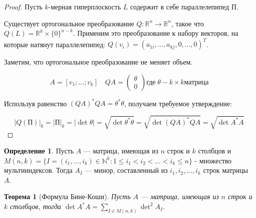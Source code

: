 \documentclass[a5paper]{article}
\newcounter{through}
\theoremstyle{plain}
\newtheorem{theorem}[through]{Теорема}
\theoremstyle{definition}
\newtheorem{definition}[through]{Определение}
\numberwithin{through}{section}
\numberwithin{equation}{section}
\begin{document}
\begin{proof}
	Пусть $k$-мерная гиперплоскость $L$ содержит в себе параллелепипед $\text{П}$.
	
	Существует ортогональное преобразование $Q : \mathbb{R}^n \to \mathbb{R}^n$, такое что $Q(L) = \mathbb{R}^k \times \{0\}^{n-k}$. Применим это преобразование к набору векторов, на которые натянут параллелепипед: $Q(v_i)=(a_{1i}, \ldots, a_{kj}, 0, \ldots, 0)^T$.
	
	Заметим, что ортогональное преобразование не меняет объем.
	
	\begin{equation*}
		A = [v_1; \ldots; v_k] \quad QA = 
		\begin{pmatrix}
			\theta \\
			0
		\end{pmatrix} 
		\text{где} \; \theta -  k \times k \text{матрица}
	\end{equation*}
	
	Используя равенство $(QA)^* QA = \theta^* \theta$, получаем требуемое утверждение:
	
	\begin{equation*}
		|Q(\text{П})|_k=|\text{П}|_k=|\det \theta|=\sqrt{\det \theta^* \theta}=\sqrt{\det (QA)^* QA}=\sqrt{\det A^* A}
	\end{equation*}
\end{proof}

\begin{definition}
	Пусть $A$ ---  матрица, имеющая из $n$ строк и $k$ столбцов и $M(n,k) = \{I = (i_1, \ldots, i_k) \in \mathbb{N}^k : 1 \leq  i_1 < i_2 < \ldots < i_k \leq n \}$ - множество мультииндексов. Тогда $A_I$ --- минор, составленный из $i_1, i_2, \ldots, i_k$ строк матрицы $A$.
\end{definition}

\begin{theorem}[Формула Бине-Коши]
	Пусть $A$ ---  матрица, имеющая из $n$ строк и $k$ столбцов, тогда $\det A^* A = \sum\limits_{I \in M(n,k)}^{} \det^2 A_I$.
\end{theorem}
\end{document}

